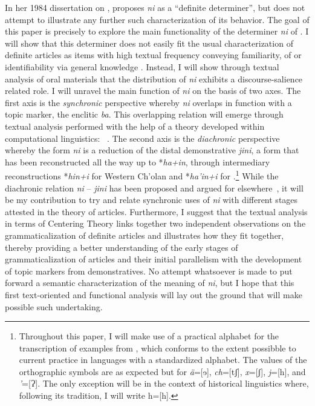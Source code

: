 \documentclass[output=paper
,modfonts
,nonflat]{langsci/langscibook}
\begin{document}
In her 1984 dissertation on  ,  \cite[209]{Knowles1984} proposes \textit{ni} as a ``definite determiner'', but does not attempt to illustrate any further such characterization of its behavior. The goal of this paper is precisely to explore the main functionality of the determiner \textit{ni} of . I will show that this determiner does not easily fit the usual characterization of definite articles as items with high textual frequency conveying familiarity,  of  or identifiability via general knowledge \citep[832]{Himmelmann2001}. Instead, I will show through textual analysis of oral materials that the distribution of \textit{ni} exhibits a discourse-salience related role. I will unravel the main function of \textit{ni} on the basis of two axes. The first axis is the \textit{synchronic} perspective whereby \textit{ni} overlaps in function with a topic marker, the enclitic \textit{ba}. This overlapping relation will emerge through textual analysis performed with the help of a theory developed within computational linguistics: ~\citep{GroszEtAlii1995}. The second axis is the \textit{diachronic} perspective whereby the form \textit{ni} is a reduction of the distal demonstrative \textit{jini}, a form that has been reconstructed all the way up to  *\textit{ha+in}, through intermediary reconstructions *\textit{hin+i} for Western Ch'olan and *\textit{ha'in+i} for .\footnote{Throughout this paper, I will make use of a practical alphabet for the transcription of examples from , which conforms to the extent possibble to current practice in  languages with a standardized alphabet. The values of the orthographic symbols are as expected but for \textit{ä}=[ɘ], \textit{ch}=[tʃ], \textit{x}=[ʃ], \textit{j}=[h], and \textit{’}=[Ɂ].  The only exception will be in the context of  historical linguistics where, following its tradition, I will write h=[h].} While the diachronic relation \textit{ni} -- \textit{jini} has been proposed and argued for elsewhere~\citep{Mora-Marin2009}, it will be my contribution to try and relate synchronic uses of \textit{ni} with different stages attested in the  theory of articles. Furthermore, I suggest that the textual analysis in terms of Centering Theory links together two independent observations on the grammaticalization of definite articles and illustrates how they fit together, thereby providing a better understanding of the early stages of grammaticalization of articles and their initial parallelism with the development of topic markers from demonstratives. No attempt whatsoever is made to put forward a semantic characterization of the meaning of \textit{ni}, but I hope that this first text-oriented and functional analysis will lay out the ground that will make possible such undertaking.
\end{document}
